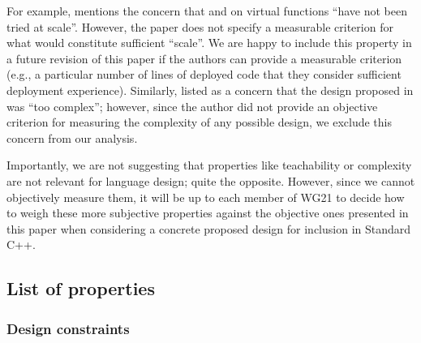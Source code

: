 For example, \cite{P3573R0} mentions the concern that  and  on virtual functions ``have not been tried at scale''. However, the paper does not specify a measurable criterion for what would constitute sufficient ``scale''. We are happy to include this property in a future revision of this paper if the authors can provide a measurable criterion (e.g., a particular number of lines of deployed code that they consider sufficient deployment experience). Similarly, \cite{P3506R0} listed as a concern that the design proposed in \cite{P3097R0} was ``too complex''; however, since the author did not provide an objective criterion for measuring the complexity of any possible design, we exclude this concern from our analysis.

Importantly, we are not suggesting that properties like teachability or complexity are not relevant for language design; quite the opposite. However, since we cannot objectively measure them, it will be up to each member of WG21 to decide how to weigh these more subjective properties against the objective ones presented in this paper when considering a concrete proposed design for inclusion in Standard C++.

\subsection{List of properties}


\newcommand{\prop}[2]{
  \paragraph*{\tcode{#1}: #2}
  \refstepcounter{paragraph}
  \label{#1}
  \addcontentsline{toc}{paragraph}{\tcode{#1}: #2}
  \mbox{}\vspace{0.5em} %
  \nopagebreak[4]
}

\newcommand{\propref}[1]{\hyperref[#1]{\tcode{#1}}}



\subsubsection{Design constraints}


